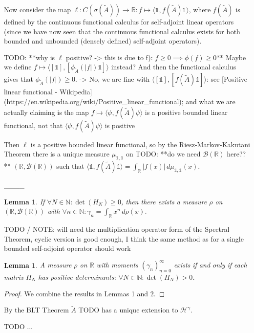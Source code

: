 \documentclass[12pt,oneside]{report}
\newtheorem{lem}[thm]{Lemma}
\begin{document}
Now consider the map $\ell: C(\sigma(\tilde{A})) \to \mathbb{R}: f \mapsto \langle \mathds{1}, f(\tilde{A})\mathds{1} \rangle$, where $f(\tilde{A})$ is defined by the continuous functional calculus for self-adjoint linear operators (since we have now seen that the continuous functional calculus exists for both bounded and unbounded (densely defined) self-adjoint operators).

TODO: **why is $\ell$ positive? -> this is due to f): $f \geq 0 \implies \phi(f) \geq 0$** Maybe we define $f \mapsto \langle [\mathds{1}], [\phi_{\tilde{A}}(|f|)\mathds{1}] \rangle$ instead? And then the functional calculus gives that $\phi_{\tilde{A}}(|f|) \geq 0$. -> No, we are fine with $\langle [\mathds{1}], [f(\tilde{A})\mathds{1}] \rangle$: see [Positive linear functional - Wikipedia](https://en.wikipedia.org/wiki/Positive_linear_functional); and what we are actually claiming is the map $f \mapsto \langle \psi, f(\tilde{A})\psi \rangle$ is a positive bounded linear functional, not that $\langle \psi, f(\tilde{A})\psi \rangle$ is positive

Then $\ell$ is a positive bounded linear functional, so by the Riesz-Markov-Kakutani Theorem there is a unique measure $\mu_{\mathds{1},\mathds{1}}$ on TODO: **do we need $\mathcal{B}(\mathbb{R})$ here??** $(\mathbb{R}, \mathcal{B}(\mathbb{R}))$ such that $\langle \mathds{1}, f(\tilde{A})\mathds{1} \rangle = \int _{\mathbb{R}} |f(x)| \, d\mu_{\mathds{1},\mathds{1}}(x)$.

____

\begin{lem}
    If $\forall N \in \mathbb{N}: \det(H_{N}) \geq 0$, then there exists a measure $\rho$ on $(\mathbb{R}, \mathcal{B}(\mathbb{R}))$ with $\forall n \in \mathbb{N}: \gamma_{n} = \int _{\mathbb{R}} x^{n} \, d\rho(x)$.
\end{lem}

 TODO / NOTE: will need the multiplication operator form of the Spectral Theorem, cyclic version is good enough, I think the same method as for a single bounded self-adjoint operator should work

\begin{lem}
    A measure $\rho$ on $\mathbb{R}$ with moments $(\gamma_{n})_{n=0}^{\infty}$ exists if and only if each matrix $H_{N}$ has positive determinants: $\forall N \in \mathbb{N}: \det (H_{N}) > 0$.
\end{lem}
\begin{proof}
    We combine the results in Lemmas 1 and 2.
\end{proof}



By the BLT Theorem $\tilde{A}$ TODO has a unique extension to $\mathscr{H}^{\gamma}$.

TODO ...
    



 
%
\end{document}
